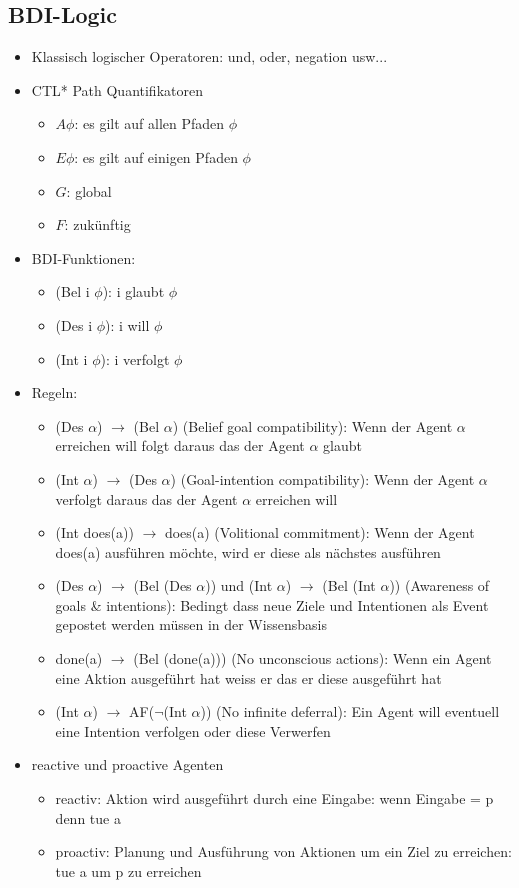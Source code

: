 \documentclass{article} %
\begin{document}
	\subsection{BDI-Logic}
	\begin{itemize}
		\item Klassisch logischer Operatoren: und, oder, negation usw...
		\item CTL* Path Quantifikatoren
		\begin{itemize}
			\item $A \phi$: es gilt auf allen Pfaden $\phi$
			\item $E \phi$: es gilt auf einigen Pfaden $\phi$
			\item $G$: global
			\item $F$: zukünftig
		\end{itemize}
		\item BDI-Funktionen:
		\begin{itemize}
			\item (Bel i $\phi$): i glaubt $\phi$
			\item (Des i $\phi$): i will $\phi$
			\item (Int i $\phi$): i verfolgt $\phi$
		\end{itemize}
		\item Regeln:
		\begin{itemize}
			\item (Des $\alpha$) $\rightarrow$ (Bel $\alpha$) (Belief goal compatibility): Wenn der Agent $\alpha$ erreichen will folgt daraus das der Agent $\alpha$ glaubt
			\item (Int $\alpha$) $\rightarrow$ (Des $\alpha$) (Goal-intention compatibility): Wenn der Agent $\alpha$ verfolgt daraus das der Agent $\alpha$ erreichen will
			\item (Int does(a)) $\rightarrow$ does(a) (Volitional commitment): Wenn der Agent does(a) ausführen möchte, wird er diese als nächstes ausführen
			\item (Des $\alpha$) $\rightarrow$ (Bel (Des $\alpha$)) und (Int $\alpha$) $\rightarrow$ (Bel (Int $\alpha$)) (Awareness of goals \& intentions): Bedingt dass neue Ziele und Intentionen als Event gepostet werden müssen in der Wissensbasis
			\item done(a) $\rightarrow$ (Bel (done(a))) (No unconscious actions): Wenn ein Agent eine Aktion ausgeführt hat weiss er das er diese ausgeführt hat
			\item (Int $\alpha$) $\rightarrow$ AF($\neg$(Int $\alpha$)) (No infinite deferral): Ein Agent will eventuell eine Intention verfolgen oder diese Verwerfen
		\end{itemize}
		\item reactive und proactive Agenten
		\begin{itemize}
			\item reactiv: Aktion wird ausgeführt durch eine Eingabe: wenn Eingabe = p denn tue a
			\item proactiv: Planung und Ausführung von Aktionen um ein Ziel zu erreichen: tue a um p zu erreichen
		\end{itemize}
	\end{itemize}
	
\end{document}
